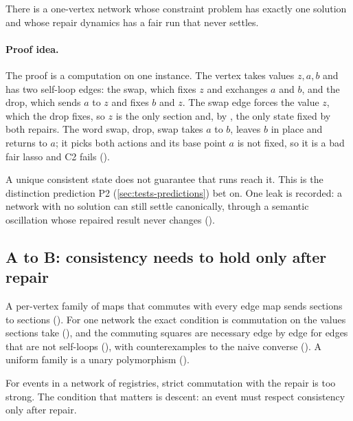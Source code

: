 \begin{proposition}\label{prop:flip2}
There is a one-vertex network whose constraint problem has exactly one solution and whose repair
dynamics has a fair run that never settles.
\end{proposition}

\paragraph{Proof idea.}
The proof is a computation on one instance. The vertex takes values $z, a, b$ and has two self-loop
edges: the swap, which fixes $z$ and exchanges $a$ and $b$, and the drop, which sends $a$ to $z$ and
fixes $b$ and $z$. The swap edge forces the value $z$, which the drop fixes, so $z$ is the only
section and, by , the only state fixed by both repairs. The word swap,
drop, swap takes $a$ to $b$, leaves $b$ in place and returns to $a$; it picks both actions and its
base point $a$ is not fixed, so it is a bad fair lasso and C2 fails ().

A unique consistent state does not guarantee that runs reach it. This is the distinction prediction P2
(\cref{sec:tests-predictions}) bet on. One leak is recorded: a network with
no solution can still settle canonically, through a semantic oscillation whose repaired result never
changes ().

\subsection{A to B: consistency needs to hold only after repair}

A per-vertex family of maps that commutes with every edge map sends sections to sections
(). For one network the exact condition is commutation on the values
sections take (), and the commuting squares are necessary edge by edge for edges
that are not self-loops (), with counterexamples to the naive converse
(). A uniform family is a unary polymorphism
().

For events in a network of registries, strict commutation with the repair is too strong. The
condition that matters is descent: an event must respect consistency only after repair.

